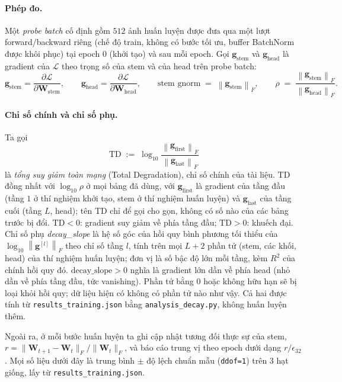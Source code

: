 \paragraph{Phép đo.} Một \emph{probe batch} cố định gồm $512$ ảnh huấn luyện
được đưa qua một lượt forward/\allowbreak backward riêng (chế độ train, không có bước tối
ưu, buffer BatchNorm được khôi phục) tại epoch $0$ (khởi tạo) và sau mỗi epoch.
Gọi $\mathbf{g}_{\text{stem}}$ và $\mathbf{g}_{\text{head}}$ là gradient của $\mathcal{L}$
theo trọng số của stem và của head trên probe batch:
\[
  \mathbf{g}_{\text{stem}} = \frac{\partial\mathcal{L}}{\partial\mathbf{W}_{\text{stem}}},
  \qquad
  \mathbf{g}_{\text{head}} = \frac{\partial\mathcal{L}}{\partial\mathbf{W}_{\text{head}}},
  \qquad
  \text{stem gnorm} \;=\; \left\|\mathbf{g}_{\text{stem}}\right\|_F,
  \qquad
  \rho \;=\; \frac{\left\|\mathbf{g}_{\text{stem}}\right\|_F}{\left\|\mathbf{g}_{\text{head}}\right\|_F}.
\]
\paragraph{Chỉ số chính và chỉ số phụ.} Ta gọi
\[
  \mathrm{TD} \;:=\; \log_{10}\frac{\left\|\mathbf{g}_{\text{first}}\right\|_F}{\left\|\mathbf{g}_{\text{last}}\right\|_F}
\]
là \emph{tổng suy giảm toàn mạng} (Total Degradation), chỉ số chính của tài liệu. TD đồng
nhất với $\log_{10}\rho$ ở mọi bảng đã dùng, với $\mathbf{g}_{\text{first}}$ là gradient của
tầng đầu (tầng $1$ ở thí nghiệm khởi tạo, stem ở thí nghiệm huấn luyện) và
$\mathbf{g}_{\text{last}}$ của tầng cuối (tầng $L$, head); tên TD chỉ để gọi cho gọn, không có số
nào của các bảng trước bị đổi. $\mathrm{TD}<0$: gradient suy giảm về phía tầng đầu;
$\mathrm{TD}>0$: khuếch đại. Chỉ số phụ \emph{decay\_slope} là hệ số góc của hồi quy bình
phương tối thiểu của $\log_{10}\left\|\mathbf{g}^{[l]}\right\|_F$ theo chỉ số tầng $l$, tính trên mọi
$L+2$ phần tử (stem, các khối, head) của thí nghiệm huấn luyện; đơn vị là số bậc độ lớn mỗi tầng,
kèm $R^{2}$ của chính hồi quy đó. $\text{decay\_slope}>0$ nghĩa là gradient lớn dần về phía head
(nhỏ dần về phía tầng đầu, tức vanishing). Phần tử bằng $0$ hoặc không hữu hạn sẽ bị loại khỏi
hồi quy; dữ liệu hiện có không có phần tử nào như vậy. Cả hai được tính từ
\texttt{results\_training.json} bằng \texttt{analysis\_decay.py}, không huấn luyện thêm.

Ngoài ra, ở mỗi bước huấn luyện ta ghi cập nhật tương đối thực sự của stem,
$r = \|\mathbf{W}_{t+1}-\mathbf{W}_t\|_F/\|\mathbf{W}_t\|_F$, và báo cáo trung vị
theo epoch dưới dạng $r/\epsilon_{32}$. Mọi số liệu dưới đây là trung bình
$\pm$ độ lệch chuẩn mẫu (\texttt{ddof=1}) trên $3$ hạt giống, lấy từ
\texttt{results\_training.json}.

